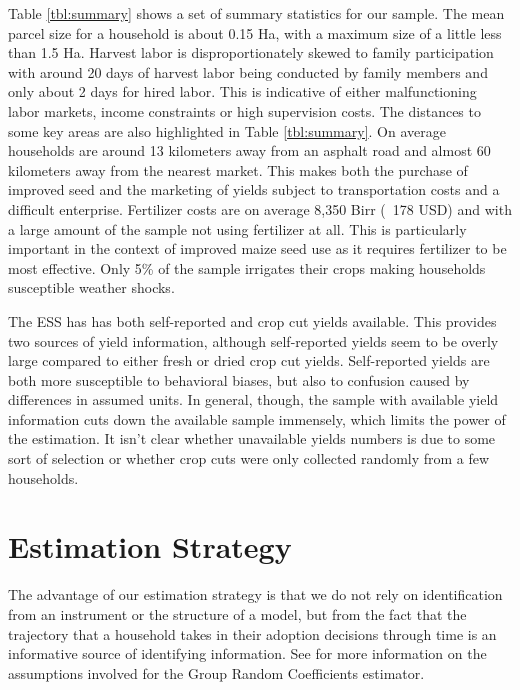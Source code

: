 \documentclass{article}
\begin{document}
Table \ref{tbl:summary} shows a set of summary statistics for our sample. The mean parcel size for a household is about 0.15 Ha, with a maximum size of a little less than 1.5 Ha. Harvest labor is disproportionately skewed to family participation with around 20 days of harvest labor being conducted by family members and only about 2 days for hired labor. This is indicative of either malfunctioning labor markets, income constraints or high supervision costs. The distances to some key areas are also highlighted in Table \ref{tbl:summary}. On average households are around 13 kilometers away from an asphalt road and almost 60 kilometers away from the nearest market. This makes both the purchase of improved seed and the marketing of yields subject to transportation costs and a difficult enterprise. Fertilizer costs are on average 8,350 Birr (~178 USD) and with a large amount of the sample not using fertilizer at all. This is particularly important in the context of improved maize seed use as it requires fertilizer to be most effective. Only 5\% of the sample irrigates their crops making households susceptible weather shocks.



The ESS has has both self-reported and crop cut yields available. This provides two sources of yield information, although self-reported yields seem to be overly large compared to either fresh or dried crop cut yields. Self-reported yields are both more susceptible to behavioral biases, but also to confusion caused by differences in assumed units. In general, though, the sample with available yield information cuts down the available sample immensely, which limits the power of the estimation. It isn't clear whether unavailable yields numbers is due to some sort of selection or whether crop cuts were only collected randomly from a few households.

\section{Estimation Strategy}

The advantage of our estimation strategy is that we do not rely on identification from an instrument or the structure of a model, but from the fact that the trajectory that a household takes in their adoption decisions through time is an informative source of identifying information. See \cite{Tjernstrom_Emilia_Dalia_Ghanem_Oscar_Barriga_Cabanillas_Travis_J_Lybbert_Jeffrey_D_Michler_and_Aleksandr_Michuda2020-bc} for more information on the assumptions involved for the Group Random Coefficients estimator. 
\end{document}
